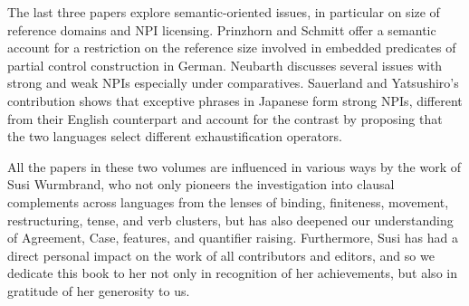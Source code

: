 \documentclass[output=paper]{langscibook}
\begin{document}
The last three papers explore semantic-oriented issues, in particular on size of reference domains and NPI licensing.  
Prinzhorn and Schmitt offer a semantic account for a restriction on the reference size involved in embedded predicates of partial control construction in German.
Neubarth discusses several issues with strong and weak NPIs especially under comparatives. 
Sauerland and Yatsushiro's contribution shows that exceptive phrases in Japanese form strong NPIs, different from their English counterpart and account for the contrast by proposing that the two languages select different exhaustification operators. 

All the papers in these two volumes are influenced in various ways by the work of Susi Wurmbrand, who not only pioneers the investigation into clausal complements across languages from the lenses of binding, finiteness, movement, restructuring, tense, and verb clusters, but has also deepened our understanding of Agreement, Case, features, and quantifier raising. Furthermore, Susi has had a direct personal impact on the work of all contributors and editors, and so we dedicate this book to her not only in recognition of her achievements, but also in gratitude of her generosity to us.


{\sloppy\printbibliography[heading=subbibliography,notkeyword=this]}
\end{document}
